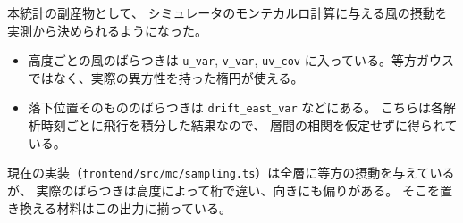本統計の副産物として、
シミュレータのモンテカルロ計算に与える風の摂動を実測から決められるようになった。

\begin{itemize}
  \item 高度ごとの風のばらつきは \texttt{u\_var}, \texttt{v\_var}, \texttt{uv\_cov}
        に入っている。等方ガウスではなく、実際の異方性を持った楕円が使える。
  \item 落下位置そのもののばらつきは \texttt{drift\_east\_var} などにある。
        こちらは各解析時刻ごとに飛行を積分した結果なので、
        層間の相関を仮定せずに得られている。
\end{itemize}

現在の実装（\texttt{frontend/src/mc/sampling.ts}）は全層に等方の摂動を与えているが、
実際のばらつきは高度によって桁で違い、向きにも偏りがある。
そこを置き換える材料はこの出力に揃っている。
